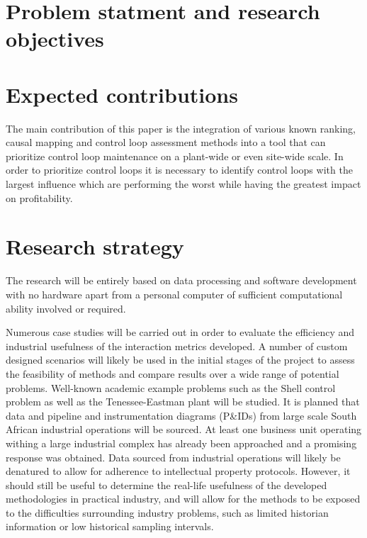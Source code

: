 \documentclass{article}
\begin{document}


%



\section{Problem statment and research objectives}



\section{Expected contributions}

The main contribution of this paper is the integration of various known ranking, causal mapping and control loop assessment methods into a tool that can prioritize control loop maintenance on a plant-wide or even site-wide scale.
In order to prioritize control loops it is necessary to identify control loops with the largest influence which are performing the worst while having the greatest impact on profitability.



\section{Research strategy}

The research will be entirely based on data processing and software development with no hardware apart from a personal computer of sufficient computational ability involved or required.

Numerous case studies will be carried out in order to evaluate the efficiency and industrial usefulness of the interaction metrics developed.
A number of custom designed scenarios will likely be used in the initial stages of the project to assess the feasibility of methods and compare results over a wide range of potential problems.
Well-known academic example problems such as the Shell control problem as well as the Tenessee-Eastman plant will be studied.
It is planned that data and pipeline and instrumentation diagrams (P\&IDs) from large scale South African industrial operations will be sourced.
At least one business unit operating withing a large industrial complex has already been approached and a promising response was obtained.
Data sourced from industrial operations will likely be denatured to allow for adherence to intellectual property protocols.
However, it should still be useful to determine the real-life usefulness of the developed methodologies in practical industry, and will allow for the methods to be exposed to the difficulties surrounding industry problems, such as limited historian information or low historical sampling intervals.
\end{document}
